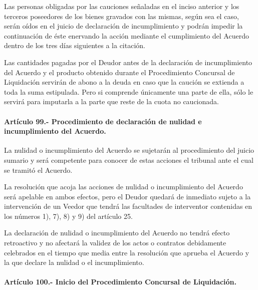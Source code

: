 \documentclass[
]{book}
\begin{document}
Las personas obligadas por las cauciones señaladas en el inciso anterior y los terceros poseedores de los bienes gravados con las mismas, según sea el caso, serán oídos en el juicio de declaración de incumplimiento y podrán impedir la continuación de éste enervando la acción mediante el cumplimiento del Acuerdo dentro de los tres días siguientes a la citación.

Las cantidades pagadas por el Deudor antes de la declaración de incumplimiento del Acuerdo y el producto obtenido durante el Procedimiento Concursal de Liquidación servirán de abono a la deuda en caso que la caución se extienda a toda la suma estipulada. Pero si comprende únicamente una parte de ella, sólo le servirá para imputarla a la parte que reste de la cuota no caucionada.

\hypertarget{artuxedculo-99.--procedimiento-de-declaraciuxf3n-de-nulidad-e-incumplimiento-del-acuerdo.}{%
\paragraph*{Artículo 99.- Procedimiento de declaración de nulidad e incumplimiento del Acuerdo.}\label{artuxedculo-99.--procedimiento-de-declaraciuxf3n-de-nulidad-e-incumplimiento-del-acuerdo.}}

La nulidad o incumplimiento del Acuerdo se sujetarán al procedimiento del juicio sumario y será competente para conocer de estas acciones el tribunal ante el cual se tramitó el Acuerdo.

La resolución que acoja las acciones de nulidad o incumplimiento del Acuerdo será apelable en ambos efectos, pero el Deudor quedará de inmediato sujeto a la intervención de un Veedor que tendrá las facultades de interventor contenidas en los números 1), 7), 8) y 9) del artículo 25.

La declaración de nulidad o incumplimiento del Acuerdo no tendrá efecto retroactivo y no afectará la validez de los actos o contratos debidamente celebrados en el tiempo que media entre la resolución que aprueba el Acuerdo y la que declare la nulidad o el incumplimiento.

\hypertarget{artuxedculo-100.--inicio-del-procedimiento-concursal-de-liquidaciuxf3n.}{%
\paragraph*{Artículo 100.- Inicio del Procedimiento Concursal de Liquidación.}\label{artuxedculo-100.--inicio-del-procedimiento-concursal-de-liquidaciuxf3n.}}
\end{document}
